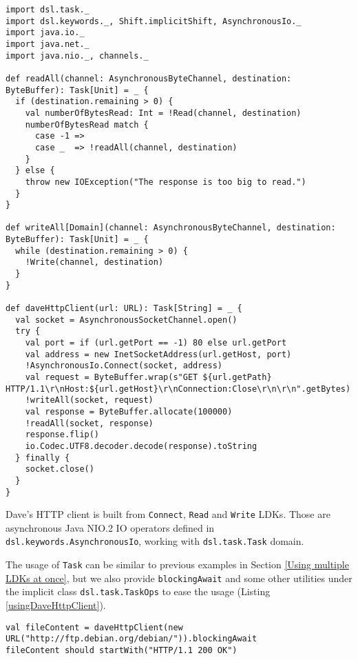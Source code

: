 \begin{lstlisting}[caption={Dave's HTTP client},label={daveHttpClient}]
import dsl.task._
import dsl.keywords._, Shift.implicitShift, AsynchronousIo._
import java.io._
import java.net._
import java.nio._, channels._

def readAll(channel: AsynchronousByteChannel, destination: ByteBuffer): Task[Unit] = _ {
  if (destination.remaining > 0) {
    val numberOfBytesRead: Int = !Read(channel, destination)
    numberOfBytesRead match {
      case -1 =>
      case _  => !readAll(channel, destination)
    }
  } else {
    throw new IOException("The response is too big to read.")
  }
}

def writeAll[Domain](channel: AsynchronousByteChannel, destination: ByteBuffer): Task[Unit] = _ {
  while (destination.remaining > 0) {
    !Write(channel, destination)
  }
}

def daveHttpClient(url: URL): Task[String] = _ {
  val socket = AsynchronousSocketChannel.open()
  try {
    val port = if (url.getPort == -1) 80 else url.getPort
    val address = new InetSocketAddress(url.getHost, port)
    !AsynchronousIo.Connect(socket, address)
    val request = ByteBuffer.wrap(s"GET ${url.getPath} HTTP/1.1\r\nHost:${url.getHost}\r\nConnection:Close\r\n\r\n".getBytes)
    !writeAll(socket, request)
    val response = ByteBuffer.allocate(100000)
    !readAll(socket, response)
    response.flip()
    io.Codec.UTF8.decoder.decode(response).toString
  } finally {
    socket.close()
  }
}
\end{lstlisting}

Dave's HTTP client is built from \lstinline{Connect}, \lstinline{Read} and \lstinline{Write} LDKs. Those are asynchronous Java NIO.2 IO operators defined in \lstinline{dsl.keywords.AsynchronousIo}, working with \lstinline{dsl.task.Task} domain.

The usage of \lstinline{Task} can be similar to previous examples in Section \ref{Using multiple LDKs at once}, but we also provide \lstinline{blockingAwait} and some other utilities under the implicit class \lstinline{dsl.task.TaskOps} to ease the usage (Listing \ref{usingDaveHttpClient}).

\begin{lstlisting}[caption={Using Dave's http client},label={usingDaveHttpClient}]
val fileContent = daveHttpClient(new URL("http://ftp.debian.org/debian/")).blockingAwait
fileContent should startWith("HTTP/1.1 200 OK")
\end{lstlisting}



